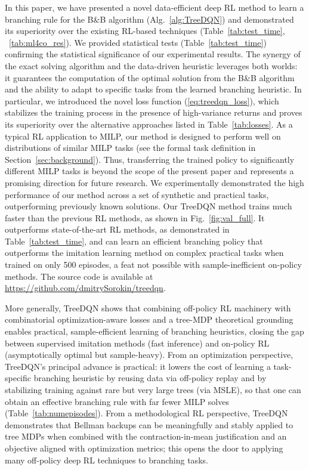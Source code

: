 \documentclass[preprint,12pt]{elsarticle} %
\theoremstyle{plain}
\theoremstyle{definition}
\theoremstyle{remark}
\begin{document}
In this paper, we have presented a novel data-efficient deep RL method to learn a branching rule for the B\&B algorithm (Alg.~\ref{alg:TreeDQN}) and demonstrated its superiority over the existing RL-based techniques (Table~\ref{tab:test_time}, ~\ref{tab:ml4co_res}). We provided statistical tests (Table~\ref{tab:test_time}) confirming the statistical significance of our experimental results. The synergy of the exact solving algorithm and the data-driven heuristic leverages both worlds: it guarantees the computation of the optimal solution from the B\&B algorithm and the ability to adapt to specific tasks from the learned branching heuristic. In particular, we introduced the novel loss function (\ref{eq:treedqn_loss}), which stabilizes the training process in the presence of high-variance returns and proves its superiority over the alternative approaches listed in Table~\ref{tab:losses}.  As a typical RL application to MILP, our method is designed to perform well on distributions of similar MILP tasks (see the formal task definition in Section~\ref{sec:background}). Thus, transferring the trained policy to significantly different MILP tasks is beyond the scope of the present paper and represents a promising direction for future research. We experimentally demonstrated the high performance of our method across a set of synthetic and practical tasks, outperforming previously known solutions. Our TreeDQN method trains much faster than the previous RL methods, as shown in Fig.~\ref{fig:val_full}. It outperforms state-of-the-art RL methods, as demonstrated in Table~\ref{tab:test_time}, and can learn an efficient branching policy that outperforms the imitation learning method on complex practical tasks when trained on only 500 episodes, a feat not possible with sample-inefficient on-policy methods. The source code is available at \url{https://github.com/dmitrySorokin/treedqn}. 

More generally, TreeDQN shows that combining off-policy RL machinery with combinatorial optimization-aware losses and a tree-MDP theoretical grounding enables practical, sample-efficient learning of branching heuristics, closing the gap between supervised imitation methods (fast inference) and on-policy RL (asymptotically optimal but sample-heavy). From an optimization perspective, TreeDQN’s principal advance is practical: it lowers the cost of learning a task-specific branching heuristic by reusing data via off-policy replay and by stabilizing training against rare but very large trees (via MSLE), so that one can obtain an effective branching rule with far fewer MILP solves (Table~\ref{tab:numepisodes}). From a methodological RL perspective, TreeDQN demonstrates that Bellman backups can be meaningfully and stably applied to tree MDPs when combined with the contraction-in-mean justification and an objective aligned with optimization metrics; this opens the door to applying many off-policy deep RL techniques to branching tasks.
\end{document}
